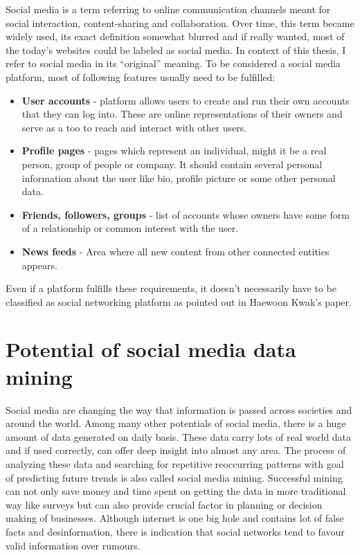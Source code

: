 Social media is a term referring to online communication channels meant for social interaction, content-sharing and collaboration. Over time, this term became widely used, its exact definition somewhat blurred and if really wanted, most of the today's websites could be labeled as social media. In context of this thesis,  I refer to social media in its “original” meaning. To be considered a social media platform, most of following features usually need to be fulfilled:

\begin{itemize}
  \item \textbf{User accounts} - platform allows users to create and run their own accounts that they can log into. These are online representations of their owners and serve as a too to reach and interact with other users.
  \item \textbf{Profile pages} - pages which represent an individual, might it be a real person, group of people or company. It should contain several personal information about the user like bio, profile picture or some other personal data.
  \item \textbf{Friends, followers, groups} - list of accounts whose owners have some form of a relationship  or common interest with the user.
  \item \textbf{News feeds} - Area where all new content from other connected entities appears.
\end{itemize}

Even if a platform fulfills these requirements, it doesn't necessarily have to be classified as social networking platform as pointed out in Haewoon Kwak's paper\cite{kwak2010twitter}.

\section{Potential of social media data mining}
Social media are changing the way that information is passed across societies and around the world.\cite{mayfield2008social}
Among many other potentials of social media, there is a huge amount of data generated on daily basis. These data carry lots of real world data and if used correctly, can offer deep insight into almost any area. The process of analyzing these data and searching for repetitive reoccurring patterns with goal of predicting future trends is also called social media mining. Successful mining can not only save money and time spent on getting the data in more traditional way like surveys but can also provide crucial factor in planning or decision making of businesses. Although internet is one big hole and contains lot of false facts and desinformation, there is indication that social networks tend to favour
valid information over rumours.\cite{castillo2011information} 

